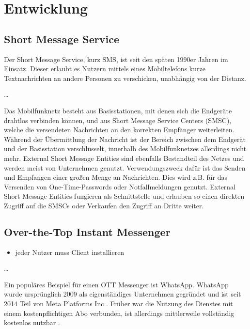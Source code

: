 \documentclass[conference]{IEEEtran}
\begin{document}
\section{Entwicklung}

\subsection{Short Message Service}

Der Short Message Service, kurz SMS, ist seit den späten 1990er Jahren im Einsatz. Dieser erlaubt es Nutzern mittels eines Mobiltelefons kurze Textnachrichten an andere Personen zu verschicken, unabhängig von der Distanz. \cite{sendoutsms}

\dots

Das Mobilfunknetz besteht aus Basisstationen, mit denen sich die Endgeräte drahtlos verbinden können, und aus Short Message Service Centers (SMSC), welche die versendeten Nachrichten an den korrekten Empfänger weiterleiten. Während der Übermittlung der Nachricht ist der Bereich zwischen dem Endgerät und der Basisstation verschlüsselt, innerhalb des Mobilfunknetzes allerdings nicht mehr. External Short Message Entities sind ebenfalls Bestandteil des Netzes und werden meist von Unternehmen genutzt. Verwendungszweck dafür ist das Senden und Empfangen einer großen Menge an Nachrichten. Dies wird z.B. für das Versenden von One-Time-Passwords oder Notfallmeldungen genutzt. External Short Message Entities fungieren als Schnittstelle und erlauben so einen direkten Zugriff auf die SMSCs oder Verkaufen den Zugriff an Dritte weiter. \cite{sendoutsms}

\subsection{Over-the-Top Instant Messenger}

\begin{itemize}
    \item jeder Nutzer muss Client installieren
\end{itemize}
\cite{rcsmno}

\dots

Ein populäres Beispiel für einen OTT Messenger ist WhatsApp.
WhatsApp wurde ursprünglich 2009 als eigenständiges Unternehmen gegründet und ist seit 2014 Teil von Meta Platforms Inc \cite{watimeline}.
Früher war die Nutzung des Dienstes mit einem kostenpflichtigen Abo verbunden, ist allerdings mittlerweile vollständig kostenlos nutzbar \cite{wakostenlos}.
\end{document}
